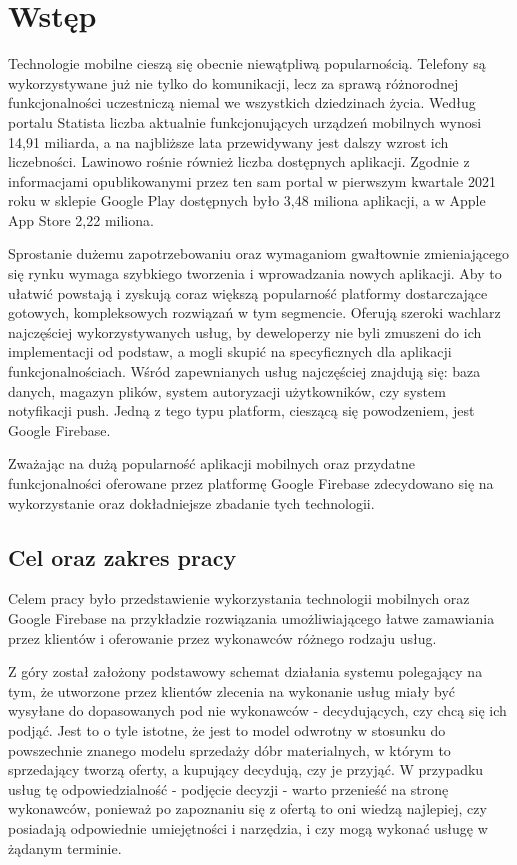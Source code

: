 \chapter{Wstęp}

Technologie mobilne cieszą się obecnie niewątpliwą popularnością. Telefony są wykorzystywane już nie tylko do komunikacji, lecz za sprawą różnorodnej funkcjonalności uczestniczą niemal we wszystkich dziedzinach życia. Według portalu Statista \cite{statista-mobiles-count} liczba aktualnie funkcjonujących urządzeń mobilnych wynosi 14,91 miliarda, a na najbliższe lata przewidywany jest dalszy wzrost ich liczebności. Lawinowo rośnie również liczba dostępnych aplikacji. Zgodnie z informacjami opublikowanymi przez ten sam portal \cite{statista-apps-count} w pierwszym kwartale 2021 roku w sklepie Google Play dostępnych było 3,48 miliona aplikacji, a w Apple App Store 2,22 miliona.

Sprostanie dużemu zapotrzebowaniu oraz wymaganiom gwałtownie zmieniającego się rynku wymaga szybkiego tworzenia i wprowadzania nowych aplikacji. Aby to ułatwić powstają i zyskują coraz większą popularność platformy dostarczające gotowych, kompleksowych rozwiązań w tym segmencie. Oferują szeroki wachlarz najczęściej wykorzystywanych usług, by deweloperzy nie byli zmuszeni do ich implementacji od podstaw, a mogli skupić na specyficznych dla aplikacji funkcjonalnościach. Wśród zapewnianych usług najczęściej znajdują się: baza danych, magazyn plików, system autoryzacji użytkowników, czy system notyfikacji push. Jedną z tego typu platform, cieszącą się powodzeniem, jest Google Firebase.

Zważając na dużą popularność aplikacji mobilnych oraz przydatne funkcjonalności oferowane przez platformę Google Firebase zdecydowano się na wykorzystanie oraz dokładniejsze zbadanie tych technologii.


\section{Cel oraz zakres pracy}

Celem pracy było przedstawienie wykorzystania technologii mobilnych oraz Google Firebase na przykładzie rozwiązania umożliwiającego łatwe zamawiania przez klientów i oferowanie przez wykonawców różnego rodzaju usług. 

Z góry został założony podstawowy schemat działania systemu polegający na tym, że utworzone przez klientów zlecenia na wykonanie usług miały być wysyłane do dopasowanych pod nie wykonawców - decydujących, czy chcą się ich podjąć. Jest to o tyle istotne, że jest to model odwrotny w stosunku do powszechnie znanego modelu sprzedaży dóbr materialnych, w którym to sprzedający tworzą oferty, a kupujący decydują, czy je przyjąć. W przypadku usług tę odpowiedzialność - podjęcie decyzji - warto przenieść na stronę wykonawców, ponieważ po zapoznaniu się z ofertą to oni wiedzą najlepiej, czy posiadają odpowiednie umiejętności i narzędzia, i czy mogą wykonać usługę w żądanym terminie. 

